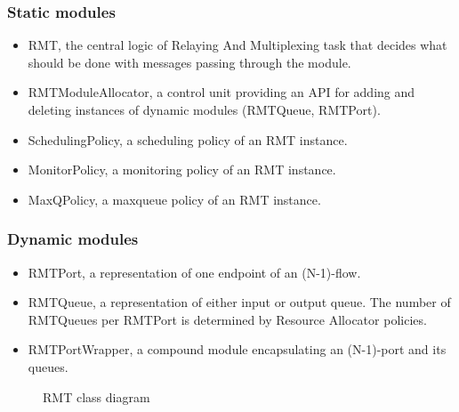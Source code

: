             \subsubsection{Static modules}
            \begin{itemize}
                \item RMT, the central logic of Relaying And Multiplexing task that decides what should be done with messages passing through the module.
                \item RMTModuleAllocator, a control unit providing an API for adding and deleting instances of dynamic modules (RMTQueue, RMTPort).
                \item SchedulingPolicy, a scheduling policy of an RMT instance.
                \item MonitorPolicy, a monitoring policy of an RMT instance.
                \item MaxQPolicy, a maxqueue policy of an RMT instance.
            \end{itemize}

            \subsubsection{Dynamic modules}
            \begin{itemize}
                \item RMTPort, a representation of one endpoint of an (N-1)-flow.
                \item RMTQueue, a representation of either input or output queue. The number of RMTQueues per RMTPort is determined by Resource Allocator policies.
                \item RMTPortWrapper, a compound module encapsulating an (N-1)-port and its queues.
            \end{itemize}


            \begin{figure}[H]
                \begin{center}
                  \caption{RMT class diagram}
                  \label{fig:rmt-erd}
                \end{center}
            \end{figure}

